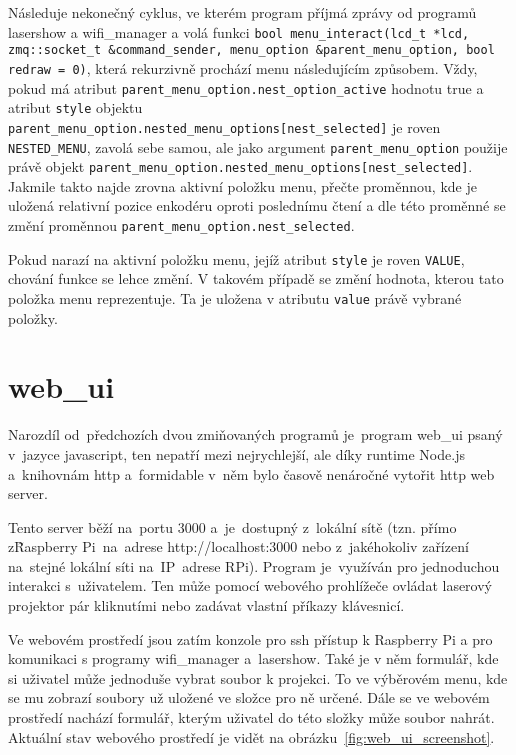 Následuje nekonečný cyklus, ve kterém program příjmá zprávy od programů lasershow a wifi\_manager a volá funkci \texttt{bool menu_interact(lcd_t *lcd, zmq::socket_t &command_sender, menu_option &parent_menu_option, bool redraw = 0)}, která rekurzivně prochází menu následujícím způsobem.
Vždy, pokud má atribut \texttt{parent_menu_option.nest_option_active} hodnotu true a atribut \texttt{style} objektu \texttt{parent_menu_option.nested_menu_options[nest_selected]} je roven \texttt{NESTED_MENU}, zavolá sebe samou, ale jako argument \texttt{parent_menu_option} použije právě objekt \texttt{parent_menu_option.nested_menu_options[nest_selected]}.
Jakmile takto najde zrovna aktivní položku menu, přečte proměnnou, kde je uložená relativní pozice enkodéru oproti poslednímu čtení a dle této proměnné se změní proměnnou \texttt{parent_menu_option.nest_selected}.

Pokud narazí na aktivní položku menu, jejíž atribut \texttt{style} je roven \texttt{VALUE}, chování funkce se lehce změní. V takovém případě se změní hodnota, kterou tato položka menu reprezentuje. Ta je uložena v atributu \texttt{value} právě vybrané položky.

\section{web\_ui}

Narozdíl od~předchozích dvou zmiňovaných programů je~program web\_ui psaný v~jazyce javascript, ten nepatří mezi nejrychlejší, ale díky runtime Node.js a~knihovnám http a~formidable v~něm bylo časově nenáročné vytořit http web server.

Tento server běží na~portu 3000 a~je~dostupný z~lokální sítě (tzn. přímo z\~Raspberry Pi~na~adrese http://localhost:3000 nebo z~jakéhokoliv zařízení na~stejné lokální síti na~IP~adrese RPi).
Program je~využíván pro jednoduchou interakci s~uživatelem.
Ten může pomocí webového prohlížeče ovládat laserový projektor pár kliknutími nebo zadávat vlastní příkazy klávesnicí.

Ve webovém prostředí jsou zatím konzole pro ssh přístup k Raspberry Pi a pro komunikaci s programy wifi\_manager a~lasershow.
Také je v něm formulář, kde si uživatel může jednoduše vybrat soubor k projekci.
To ve výběrovém menu, kde se mu zobrazí soubory už uložené ve složce pro ně určené. Dále se ve webovém prostředí nachází formulář, kterým uživatel do této složky může soubor nahrát.
Aktuální stav webového prostředí je vidět na obrázku~\ref{fig:web_ui_screenshot}.

